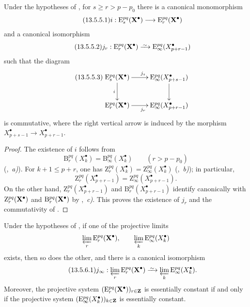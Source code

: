 \begin{lemma}[13.5.5]
\label{0.13.5.5}
Under the hypotheses of \textup{}, for
$s\geq r>p-p_0$ there is a canonical monomorphism
\begin{equation}
\label{0.13.5.5.1}
\tag{13.5.5.1}
  i:
  \mathrm{E}_s^{pq}(\mathbf{X}^\bullet)
  \longrightarrow
  \mathrm{E}_r^{pq}(\mathbf{X}^\bullet)
\end{equation}
and a canonical isomorphism
\begin{equation}
\label{0.13.5.5.2}
\tag{13.5.5.2}
  j_r:
  \mathrm{E}_r^{pq}(\bb{X}^\bullet)
  \simto
  \mathrm{E}_\infty^{pq}(X^\bullet_{p+r-1})
\end{equation}
such that the diagram
\begin{equation}
\label{0.13.5.5.3}
\tag{13.5.5.3}
  \xymatrix{
    \mathrm{E}_s^{pq}(\bb{X}^\bullet)
      \ar[r]^{j_s}\ar[d]_i
    &
    \mathrm{E}_\infty^{pq}(X^\bullet_{p+s-1})
      \ar[d]
    \\
    \mathrm{E}_r^{pq}(\bb{X}^\bullet)
      \ar[r]_{j_r}
    &
    \mathrm{E}_\infty^{pq}(X^\bullet_{p+r-1})
  }
\end{equation}
is commutative, where the right vertical arrow is induced by the
morphism
$X^\bullet_{p+s-1}\longrightarrow X^\bullet_{p+r-1}$.
\end{lemma}

\begin{proof}
The existence of $i$ follows from
\[
  \mathrm{B}_r^{pq}(X^\bullet_k)
  =
  \mathrm{B}_\infty^{pq}(X^\bullet_k)
  \qquad (r>p-p_0)
\]
(,~\emph{a)}).
For $k+1\leq p+r$, one has $\mathrm{Z}_r^{pq}(X^\bullet_k)
=
\mathrm{Z}_\infty^{pq}(X^\bullet_k)$
(,~\emph{b)}); in particular,
\[
  \mathrm{Z}_r^{pq}(X^\bullet_{p+r-1})
  =
  \mathrm{Z}_\infty^{pq}(X^\bullet_{p+r-1}).
\]
On the other hand,
$\mathrm{Z}_r^{pq}(X^\bullet_{p+r-1})$ and
$\mathrm{B}_r^{pq}(X^\bullet_{p+r-1})$ identify canonically with
$\mathrm{Z}_r^{pq}(\mathbf{X}^\bullet)$ and
$\mathrm{B}_r^{pq}(\mathbf{X}^\bullet)$ by
,~\emph{c)}.
This proves the existence of $j_r$ and the commutativity of
.
\end{proof}

\begin{corollary}[13.5.6]
\label{0.13.5.6}
Under the hypotheses of \textup{}, if one of the projective
limits
\[
  \varprojlim_r\mathrm{E}_r^{pq}(\mathbf{X}^\bullet),
  \qquad
  \varprojlim_k\mathrm{E}_\infty^{pq}(X^\bullet_k)
\]
exists, then so does the other, and there is a canonical isomorphism
\begin{equation}
\label{0.13.5.6.1}
\tag{13.5.6.1}
  j_\infty:
  \varprojlim_r\mathrm{E}_r^{pq}(\bb{X}^\bullet)
  \simto
  \varprojlim_k\mathrm{E}_\infty^{pq}(X^\bullet_k).
\end{equation}
Moreover, the projective system
$(\mathrm{E}_r^{pq}(\mathbf{X}^\bullet))_{r\in\mathbf{Z}}$ is essentially
constant \textup{} if and only if the projective system
$(\mathrm{E}_\infty^{pq}(X^\bullet_k))_{k\in\mathbf{Z}}$ is essentially
constant.
\end{corollary}

